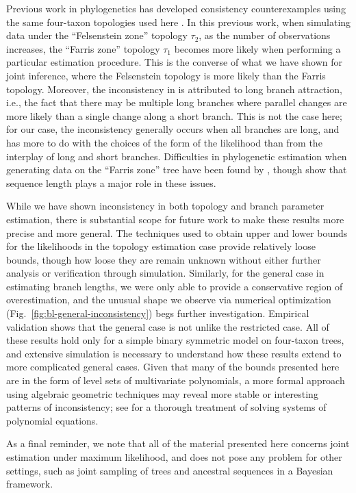\documentclass{article}
\begin{document}
Previous work in phylogenetics has developed consistency counterexamples using the same four-taxon topologies used here \cite{Felsenstein1978-rr}.
In this previous work, when simulating data under the ``Felsenstein zone'' topology $\tau_2$, as the number of observations increases, the ``Farris zone'' topology $\tau_1$ becomes more likely when performing a particular estimation procedure.
This is the converse of what we have shown for joint inference, where the Felsenstein topology is more likely than the Farris topology.
Moreover, the inconsistency in \cite{Felsenstein1978-rr} is attributed to long branch attraction, i.e., the fact that there may be multiple long branches where parallel changes are more likely than a single change along a short branch.
This is not the case here; for our case, the inconsistency generally occurs when all branches are long, and has more to do with the choices of the form of the likelihood than from the interplay of long and short branches.
Difficulties in phylogenetic estimation when generating data on the ``Farris zone'' tree have been found by \cite{Siddall1998-hq}, though \cite{Swofford2001-hr} show that sequence length plays a major role in these issues.

While we have shown inconsistency in both topology and branch parameter estimation, there is substantial scope for future work to make these results more precise and more general.
The techniques used to obtain upper and lower bounds for the likelihoods in the topology estimation case provide relatively loose bounds, though how loose they are remain unknown without either further analysis or verification through simulation.
Similarly, for the general case in estimating branch lengths, we were only able to provide a conservative region of overestimation, and the unusual shape we observe via numerical optimization (Fig.~\ref{fig:bl-general-inconsistency}) begs further investigation.
Empirical validation shows that the general case is not unlike the restricted case.
All of these results hold only for a simple binary symmetric model on four-taxon trees, and extensive simulation is necessary to understand how these results extend to more complicated general cases.
Given that many of the bounds presented here are in the form of level sets of multivariate polynomials, a more formal approach using algebraic geometric techniques may reveal more stable or interesting patterns of inconsistency; see \cite{Sturmfels2002} for a thorough treatment of solving systems of polynomial equations.

As a final reminder, we note that all of the material presented here concerns joint estimation under maximum likelihood, and does not pose any problem for other settings, such as joint sampling of trees and ancestral sequences in a Bayesian framework.
\end{document}
